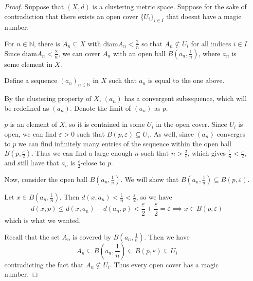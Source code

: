 \documentclass{article}
\newcommand{\diam}{\mathrm{diam}}
\theoremstyle{plain} %
\numberwithin{thm}{section} %
\theoremstyle{definition}
\begin{document}
    \begin{proof}
        Suppose that \((X,d)\) is a clustering metric space. Suppose for the sake of contradiction that there exists an open cover \(\{U_i\}_{i\in I}\) that doesnt have a magic number.

        For \(n \in \mathbb{N}\), there is \(A_n \subseteq X\) with \(\diam A_n < \frac{2}{n}\) so that \(A_n \nsubseteq U_i\) for all indices \(i \in I\). Since \(\diam A_n < \frac{2}{n}\), we can cover \(A_n\) with an open ball \(B(a_n, \frac{1}{n})\), where \(a_n\) is some element in \(X\).

        Define a sequence \((a_n)_{n\in \mathbb{N}}\) in \(X\) such that \(a_n\) is equal to the one above.

        By the clustering property of \(X\), \((a_n)\) has a convergent subsequence, which will be redefined as \((a_n)\). Denote the limit of \((a_n)\) as \(p\).

        \(p\) is an element of \(X\), so it is contained in some \(U_i\) in the open cover. Since \(U_i\) is open, we can find \(\varepsilon > 0\) such that \(B(p, \varepsilon) \subseteq U_i\). As well, since \((a_n)\) converges to \(p\) we can find infinitely many entries of the sequence within the open ball \(B(p, \frac{\varepsilon}{2})\). Thus we can find a large enough \(n\) such that \(n > \frac{2}{\varepsilon}\), which gives \(\frac{1}{n} < \frac{\varepsilon}{2}\), and still have that \(a_n\) is \(\frac{\varepsilon}{2}\)-close to \(p\).

        Now, consider the open ball \(B(a_n, \frac{1}{n})\). We will show that \(B(a_n, \frac{1}{n}) \subseteq B(p, \varepsilon)\).

        Let \(x \in B(a_n, \frac{1}{n})\). Then \(d(x, a_n) < \frac{1}{n} < \frac{\varepsilon}{2}\), so we have
        \[
            d(x,p) \leq d(x,a_n) + d(a_n,p) < \frac{\varepsilon}{2} + \frac{\varepsilon}{2} = \varepsilon \implies x \in B(p, \varepsilon)
        \]
        which is what we wanted.

        Recall that the set \(A_n\) is covered by \(B(a_n, \frac{1}{n})\). Then we have
        \[
            A_n \subseteq B(a_n, \frac{1}{n}) \subseteq B(p, \varepsilon) \subseteq U_i
        \]
        contradicting the fact that \(A_n \nsubseteq U_i\). Thus every open cover has a magic number.

    \end{proof}
\end{document}
